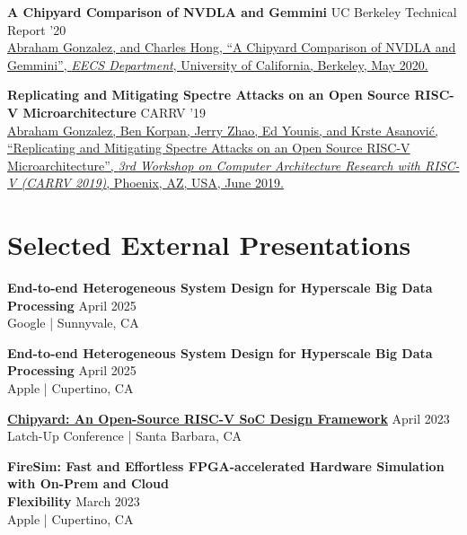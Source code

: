 \documentclass[line]{res}
\begin{document}
\begin{resume}
\textbf{A Chipyard Comparison of NVDLA and Gemmini} \hfill UC Berkeley Technical Report '20
\vspace{0.7mm}
\\
\href{https://abejgonzalez.github.io/documents/nvdla_v_gemmini.pdf}{\underline{Abraham Gonzalez}, and Charles Hong, ``A Chipyard Comparison of NVDLA and Gemmini'', \textit{EECS Department}, University of California, Berkeley, May 2020.}
\vspace{-1mm}

\label{sec:spectrerepl}
\textbf{Replicating and Mitigating Spectre Attacks on an Open Source RISC-V Microarchitecture} \hfill CARRV '19
\vspace{0.7mm}
\\
\href{https://carrv.github.io/2019/papers/carrv2019_paper_5.pdf}{\underline{Abraham Gonzalez}, Ben Korpan, Jerry Zhao, Ed Younis, and Krste Asanovi\'c, ``Replicating and Mitigating Spectre Attacks on an Open Source RISC-V Microarchitecture'', \textit{3rd Workshop on Computer Architecture Research with RISC-V (CARRV 2019)}, Phoenix, AZ, USA, June 2019.}

\section{\Large{Selected External Presentations}}
\label{sec:talks}
\vspace{2mm}

\textbf{End-to-end Heterogeneous System Design for Hyperscale Big Data Processing} \hfill April 2025
\\
Google | Sunnyvale, CA
\vspace{-1mm}

\textbf{End-to-end Heterogeneous System Design for Hyperscale Big Data Processing} \hfill April 2025
\\
Apple | Cupertino, CA
\vspace{-1mm}

\textbf{\href{https://youtu.be/pYyv8BJ5n68?si=EY9vUUn3IQko-ZE3}{Chipyard: An Open-Source RISC-V SoC Design Framework}} \hfill April 2023
\\
Latch-Up Conference | Santa Barbara, CA
\vspace{-1mm}

\textbf{FireSim: Fast and Effortless FPGA-accelerated Hardware Simulation with On-Prem and Cloud\\Flexibility} \hfill March 2023
\\
Apple | Cupertino, CA
\vspace{-1mm}


\end{resume}
\end{document}
